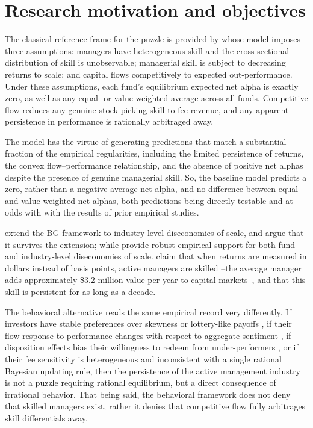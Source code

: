 \documentclass[12pt, oneside]{report}
\begin{document}
\section{Research motivation and objectives}
\label{sec:motivation}

\noindent The classical reference frame for the puzzle is provided by
\textcite{BerkGreen2004} whose model imposes three assumptions: managers
have heterogeneous skill and the cross-sectional distribution of skill is
unobservable; managerial skill is subject to decreasing returns to scale;
and capital flows competitively to expected out-performance. Under these
assumptions, each fund's equilibrium expected net alpha is exactly zero, as well as any equal- or value-weighted average across all funds. Competitive flow reduces any genuine stock-picking skill to
fee revenue, and any apparent persistence in performance is rationally
arbitraged away. 

The model has the virtue of generating predictions that
match a substantial fraction of the empirical regularities, including the
limited persistence of returns, the convex flow--performance relationship,
and the absence of positive net alphas despite the presence of genuine
managerial skill. So, the baseline model predicts a zero, rather than a negative average net alpha, and no difference between equal- and value-weighted net alphas, both predictions being directly testable and at odds with with the results of prior empirical studies.

\textcite{PastorStambaugh2012} extend the BG framework to industry-level diseconomies of scale, and argue that it survives the extension; while 
\textcite{PastorStambaughTaylor2015} provide robust empirical support for both fund- and industry-level diseconomies of scale. \textcite{BerkVanBinsbergen2015} claim that when returns are measured in dollars instead of basis points, active managers are skilled --the average manager adds approximately \$3.2 million value per year to capital markets--, and that this skill is persistent for as long as a decade.

The behavioral alternative reads the same empirical record very
differently. If investors have stable preferences over skewness or
lottery-like payoffs \parencite{Kumar2009,BaliCakiciWhitelaw2011}, if their flow response to performance changes with respect to aggregate sentiment \parencite{BakerWurgler2006,BakerWurgler2007}, if disposition effects bias their willingness to redeem from under-performers
\parencite{ShefrinStatman1985,Odean1998}, or if their fee
sensitivity is heterogeneous and inconsistent with a single rational
Bayesian updating rule, then the persistence of the active management
industry is not a puzzle requiring rational equilibrium, but a
direct consequence of irrational behavior. That being said, the behavioral framework does not deny that skilled managers exist, rather it denies that competitive flow fully arbitrages skill differentials away.
\end{document}
